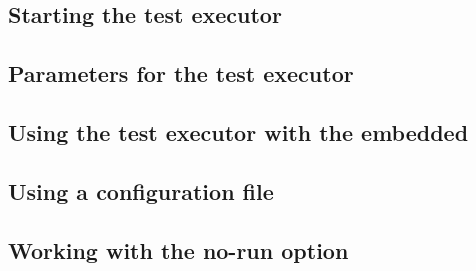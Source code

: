 



\subsection[Starting]{Starting the test executor}


\subsection[Parameters]{Parameters for the test executor}


\subsection{Using the test executor with the embedded \gddb{}}
\label{TasksTestExecEmbedded}


\subsection[Configuration Files]{Using a configuration file}
\label{TasksTestExecConfigFile}


\subsection{Working with the no-run option}
\label{TasksTestExecNorun}


